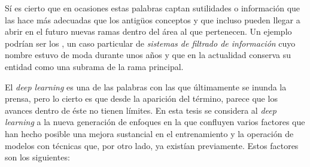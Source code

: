Sí es cierto que en ocasiones estas palabras captan sutilidades o información que las hace más adecuadas que los antigüos conceptos y que incluso pueden llegar a abrir en el futuro nuevas ramas dentro del área al que pertenecen. Un ejemplo podrían ser los , un caso particular de \textit{sistemas de filtrado de información} cuyo nombre estuvo de moda durante unos años y que en la actualidad conserva su entidad como una subrama de la rama principal.

El \textit{deep learning} es una de las palabras con las que últimamente se inunda la prensa, pero lo cierto es que desde la aparición del término, parece que los avances dentro de éste no tienen límites. En esta tesis se considera al \textit{deep learning} a la nueva generación de enfoques en la que confluyen varios factores que han hecho posible una mejora sustancial en el entrenamiento y la operación de modelos con técnicas que, por otro lado, ya existían previamente. Estos factores son los siguientes:

